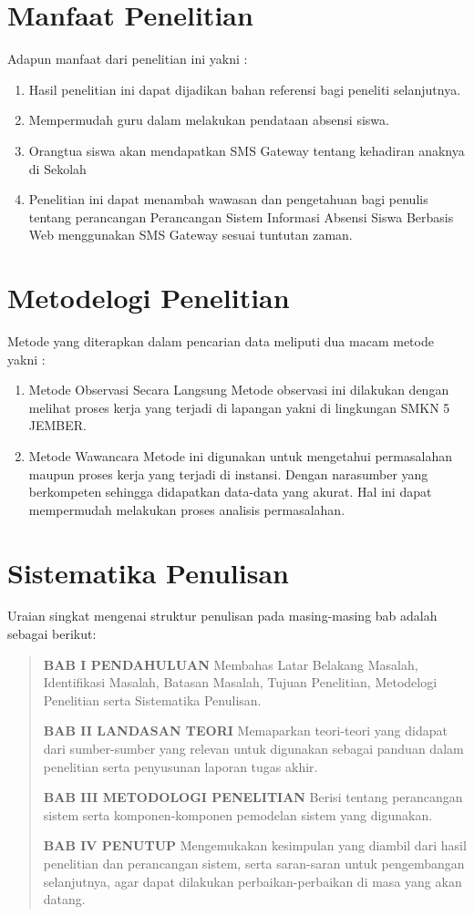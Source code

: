 \documentclass{jtetiproposalskripsi}
\begin{document}
\section{Manfaat Penelitian}
Adapun manfaat dari penelitian ini yakni :
\begin{enumerate}
\item Hasil penelitian ini dapat dijadikan bahan referensi bagi peneliti selanjutnya.
\item Mempermudah guru dalam melakukan pendataan absensi siswa.
\item Orangtua siswa akan mendapatkan SMS Gateway tentang kehadiran anaknya di Sekolah
\item Penelitian ini dapat menambah wawasan dan pengetahuan bagi penulis tentang perancangan Perancangan Sistem Informasi Absensi Siswa Berbasis Web menggunakan SMS Gateway sesuai tuntutan zaman.
\end{enumerate}

\section{Metodelogi Penelitian}
Metode yang diterapkan dalam pencarian data meliputi dua macam metode yakni :
\begin{enumerate}
\item Metode Observasi Secara Langsung Metode observasi ini dilakukan dengan melihat proses kerja yang terjadi di lapangan yakni di lingkungan SMKN 5 JEMBER.
\item Metode Wawancara Metode ini digunakan untuk mengetahui permasalahan maupun proses kerja yang terjadi di instansi. Dengan narasumber yang berkompeten sehingga didapatkan data-data yang akurat. Hal ini dapat mempermudah melakukan proses analisis permasalahan.
\end{enumerate}

\section{Sistematika Penulisan}
Uraian singkat mengenai struktur penulisan pada masing-masing bab adalah sebagai berikut:

\begin{quote}
\textbf {BAB I PENDAHULUAN}
Membahas Latar Belakang Masalah, Identifikasi Masalah, Batasan Masalah, Tujuan Penelitian, Metodelogi Penelitian serta Sistematika Penulisan.

\textbf {BAB II LANDASAN TEORI}
Memaparkan teori-teori yang didapat dari sumber-sumber yang relevan untuk digunakan sebagai panduan dalam penelitian serta penyusunan laporan tugas akhir.

\textbf {BAB III METODOLOGI PENELITIAN}
Berisi tentang perancangan sistem serta komponen-komponen pemodelan sistem yang digunakan.

\textbf {BAB IV PENUTUP}
Mengemukakan kesimpulan yang diambil dari hasil penelitian dan perancangan sistem, serta saran-saran untuk pengembangan selanjutnya, agar dapat dilakukan perbaikan-perbaikan di masa yang akan datang.

\end{quote}
\end{document}

